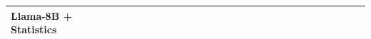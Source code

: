\begin{tabular}{l|cccc|cccc|cccc|cccc|cccc|cccc}
Llama-8B + Statistics & \cellcolor{green3}{1.039} & \cellcolor{green2}{1.086} & \cellcolor{green2}{1.100} & \cellcolor{green3}{1.152} & \cellcolor{green2}{1.253} & \cellcolor{green2}{1.756} & \cellcolor{green2}{2.118} & \cellcolor{green3}{8.596} & \cellcolor{green4}{1.049} & \cellcolor{green4}{1.246} & \cellcolor{green4}{1.363} & \cellcolor{green4}{10.091} & \cellcolor{green4}{1.455} & \cellcolor{green3}{9.586} & \cellcolor{green3}{12.732} & \cellcolor{green3}{35.360} & \cellcolor{green4}{3.117} & \cellcolor{green4}{21.103} & \cellcolor{green3}{52.717} & \cellcolor{green2}{201.35} & \cellcolor{green4}{1.408} & \cellcolor{green4}{4.013} & \cellcolor{green4}{5.126} & \cellcolor{green4}{18.316} \\
\bottomrule
\end{tabular}
